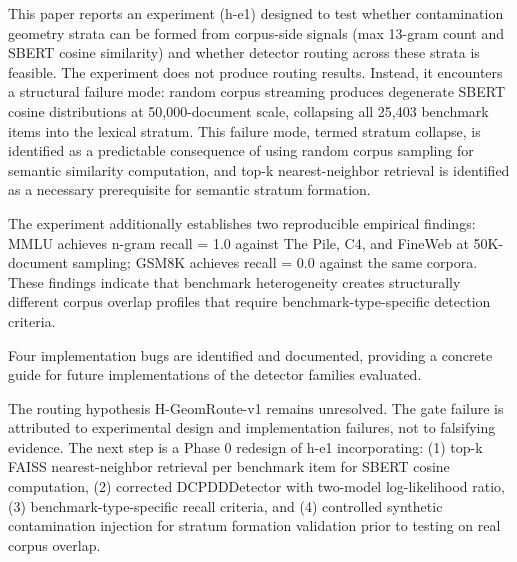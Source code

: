 
This paper reports an experiment (h-e1) designed to test whether contamination geometry strata can be formed from corpus-side signals (max 13-gram count and SBERT cosine similarity) and whether detector routing across these strata is feasible. The experiment does not produce routing results. Instead, it encounters a structural failure mode: random corpus streaming produces degenerate SBERT cosine distributions at 50,000-document scale, collapsing all 25,403 benchmark items into the lexical stratum. This failure mode, termed stratum collapse, is identified as a predictable consequence of using random corpus sampling for semantic similarity computation, and top-k nearest-neighbor retrieval is identified as a necessary prerequisite for semantic stratum formation.

The experiment additionally establishes two reproducible empirical findings: MMLU achieves n-gram recall = 1.0 against The Pile, C4, and FineWeb at 50K-document sampling; GSM8K achieves recall = 0.0 against the same corpora. These findings indicate that benchmark heterogeneity creates structurally different corpus overlap profiles that require benchmark-type-specific detection criteria.

Four implementation bugs are identified and documented, providing a concrete guide for future implementations of the detector families evaluated.

The routing hypothesis H-GeomRoute-v1 remains unresolved. The gate failure is attributed to experimental design and implementation failures, not to falsifying evidence. The next step is a Phase 0 redesign of h-e1 incorporating: (1) top-k FAISS nearest-neighbor retrieval per benchmark item for SBERT cosine computation, (2) corrected DCPDDDetector with two-model log-likelihood ratio, (3) benchmark-type-specific recall criteria, and (4) controlled synthetic contamination injection for stratum formation validation prior to testing on real corpus overlap.


